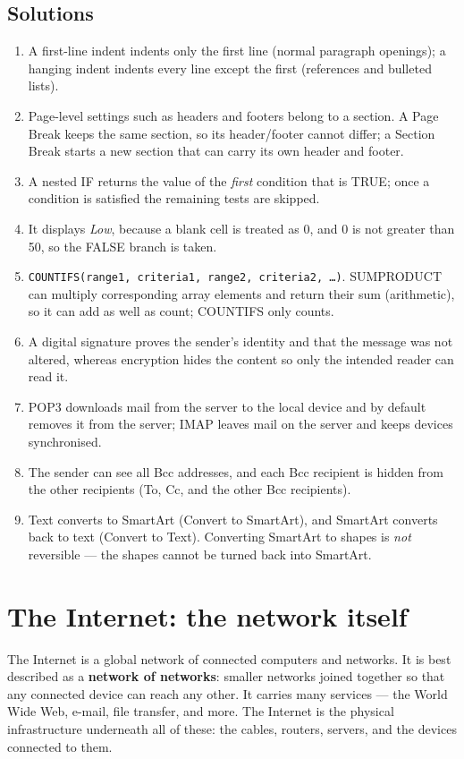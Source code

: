 \subsection*{Solutions}
\begingroup\small
\begin{enumerate}[label=\arabic*.]
  \item A first-line indent indents only the first line (normal paragraph
    openings); a hanging indent indents every line except the first
    (references and bulleted lists).
  \item Page-level settings such as headers and footers belong to a section.
    A Page Break keeps the same section, so its header/footer cannot differ;
    a Section Break starts a new section that can carry its own header and
    footer.
  \item A nested IF returns the value of the \emph{first} condition that is
    TRUE; once a condition is satisfied the remaining tests are skipped.
  \item It displays \emph{Low}, because a blank cell is treated as 0, and 0 is
    not greater than 50, so the FALSE branch is taken.
  \item \texttt{COUNTIFS(range1, criteria1, range2, criteria2, \ldots)}.
    SUMPRODUCT can multiply corresponding array elements and return their sum
    (arithmetic), so it can add as well as count; COUNTIFS only counts.
  \item A digital signature proves the sender's identity and that the message
    was not altered, whereas encryption hides the content so only the
    intended reader can read it.
  \item POP3 downloads mail from the server to the local device and by
    default removes it from the server; IMAP leaves mail on the server and
    keeps devices synchronised.
  \item The sender can see all Bcc addresses, and each Bcc recipient is hidden
    from the other recipients (To, Cc, and the other Bcc recipients).
  \item Text converts to SmartArt (Convert to SmartArt), and SmartArt
    converts back to text (Convert to Text). Converting SmartArt to shapes is
    \emph{not} reversible --- the shapes cannot be turned back into SmartArt.
\end{enumerate}
\endgroup

\section{The Internet: the network itself}
The Internet is a global network of connected computers and networks. It is
best described as a \textbf{network of networks}: smaller networks joined
together so that any connected device can reach any other. It carries many
services --- the World Wide Web, e-mail, file transfer, and more. The
Internet is the physical infrastructure underneath all of these: the cables,
routers, servers, and the devices connected to them.

